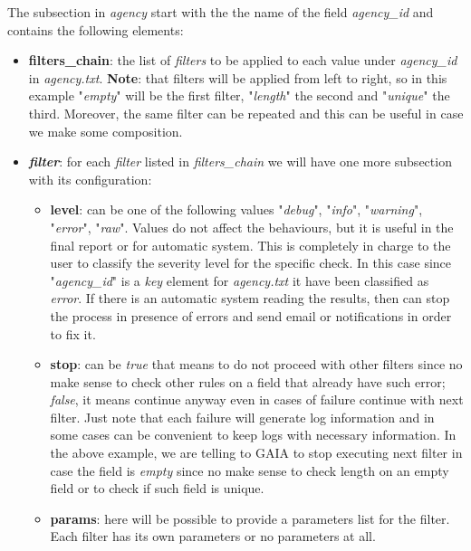 \documentclass[12pt, a4paper]{book}
\begin{document}
\begin{justify}
The subsection in \textit{agency} start with the the name of the field \textit{agency\_id} and contains the following elements:
\begin{itemize}
\item \textbf{filters\_chain}: the list of \textit{filters} to be applied to each value under \textit{agency\_id} in \textit{agency.txt}. \textbf{Note}: that filters will be applied from left to right, so in this example "\textit{empty}" will be the first filter, "\textit{length}" the second and "\textit{unique}" the third. Moreover, the same filter can be repeated and this can be useful in case we make some composition.
\item \textbf{\textit{filter}}: for each \textit{filter} listed in \textit{filters\_chain} we will have one more subsection with its configuration:
\begin{itemize}
\item \textbf{level}: can be one of the following values "\textit{debug}", "\textit{info}", "\textit{warning}", "\textit{error}", "\textit{raw}". Values do not affect the behaviours, but it is useful in the final report or for automatic system. This is completely in charge to the user to classify the severity level for the specific check. In this case since "\textit{agency\_id}" is a \textit{key} element for \textit{agency.txt} it have been classified as \textit{error}. If there is an automatic system reading the results, then can stop the process in presence of errors and send email or notifications in order to fix it.
\item \textbf{stop}: can be \textit{true} that means to do not proceed with other filters since no make sense to check other rules on a field that already have such error; \textit{false}, it means continue anyway even in cases of failure continue with next filter. Just note that each failure will generate log information and in some cases can be convenient to keep logs with necessary information. In the above example, we are telling to GAIA to stop executing next filter in case the field is \textit{empty} since no make sense to check length on an empty field or to check if such field is unique.
\item \textbf{params}: here will be possible to provide a parameters list for the filter. Each filter has its own parameters or no parameters at all.
\end{itemize}
\end{itemize}
\end{justify}

\newpage
\end{document}
